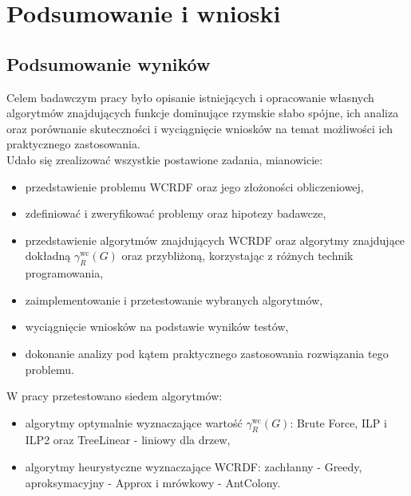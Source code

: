 \chapter{Podsumowanie i wnioski}

\section{Podsumowanie wyników}

Celem badawczym pracy było opisanie istniejących i opracowanie własnych algorytmów znajdujących funkcje dominujące rzymskie słabo spójne, ich analiza oraz porównanie skuteczności i wyciągnięcie wniosków na temat możliwości ich praktycznego zastosowania.\\
Udało się zrealizować wszystkie postawione zadania, mianowicie:
\begin{itemize}
    \item przedstawienie problemu WCRDF oraz jego złożoności obliczeniowej,
    \item zdefiniować i zweryfikować problemy oraz hipotezy badawcze,
    \item przedstawienie algorytmów znajdujących WCRDF oraz algorytmy znajdujące dokładną $\gamma^{\text{wc}}_R(G)$ oraz przybliżoną, korzystając z różnych technik programowania,
    \item zaimplementowanie i przetestowanie wybranych algorytmów,
    \item wyciągnięcie wniosków na podstawie wyników testów,
    \item dokonanie analizy pod kątem praktycznego zastosowania rozwiązania tego problemu.
\end{itemize}
W pracy przetestowano siedem algorytmów:
\begin{itemize}
    \item algorytmy optymalnie wyznaczające wartość $\gamma^{\text{wc}}_R(G)$: Brute Force, ILP i ILP2 oraz TreeLinear - liniowy dla drzew,
    \item algorytmy heurystyczne wyznaczające WCRDF: zachłanny - Greedy, aproksymacyjny - Approx i mrówkowy - AntColony.
\end{itemize}

